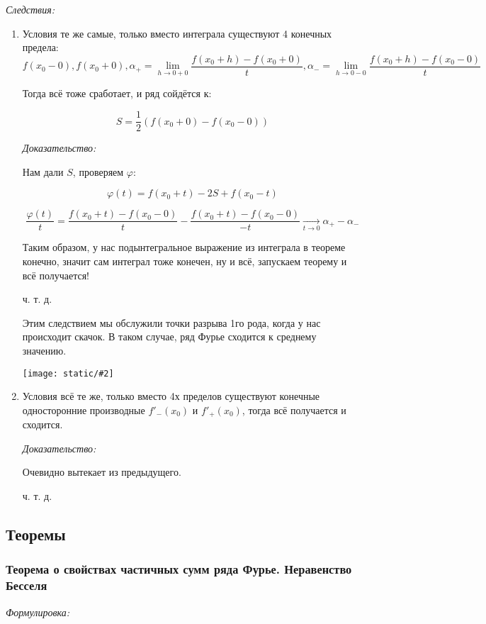 \documentclass{article}
\def\images#1#2{\begin{center}\texttt{[image: static/\#2]}\end{center}}
\def\goesto#1{\underset{#1}{\longrightarrow}}
\begin{document}
\textit{Следствия:}

\begin{enumerate}
    \item Условия те же самые, только вместо интеграла существуют 4 конечных предела:
    \[f(x_0 - 0), f(x_0 + 0), \alpha_+ = \lim_{h \rightarrow 0 + 0} \frac{f(x_0 + h) - f(x_0 + 0)}{t}, \alpha_- = \lim_{h \rightarrow 0 - 0} \frac{f(x_0 + h) - f(x_0 - 0)}{t}\]

    Тогда всё тоже сработает, и ряд сойдётся к:

    \[S = \frac{1}{2}(f(x_0 + 0) - f(x_0 - 0))\]

    \textit{Доказательство: }


    Нам дали $S$, проверяем $\varphi$:

    \[\varphi(t) = f(x_0 + t) - 2S + f(x_0 - t)\]

    \[\frac{\varphi(t)}{t} = \frac{f(x_0 + t) - f(x_0 - 0)}{t} - \frac{f(x_0 + t) - f(x_0 - 0)}{-t} \goesto{t \rightarrow 0} \alpha_+ - \alpha_-\]

    Таким образом, у нас подынтегральное выражение из интеграла в теореме конечно, значит сам интеграл тоже конечен, ну и всё, запускаем теорему и всё получается!

    ч. т. д.

    Этим следствием мы обслужили точки разрыва 1го рода, когда у нас происходит скачок. В таком случае, ряд Фурье сходится к среднему значению.

    \images{0.3}{priznak_dini.jpg}

    \item Условия всё те же, только вместо 4х пределов существуют конечные односторонние производные $f'_-(x_0)$ и $f'_+(x_0)$, тогда всё получается и сходится.
    
    \textit{Доказательство:}

    Очевидно вытекает из предыдущего.

    ч. т. д.
\end{enumerate}

\newpage
\subsection{Теоремы}

\subsubsection{Теорема о свойствах частичных сумм ряда Фурье. Неравенство Бесселя}
\textit{Формулировка:}
\end{document}
